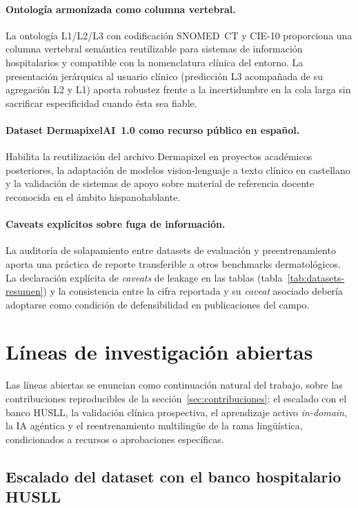 \paragraph{Ontología armonizada como columna vertebral.}
La ontología L1/L2/L3 con codificación SNOMED~CT y CIE-10
proporciona una columna vertebral semántica reutilizable para
sistemas de información hospitalarios y compatible con la
nomenclatura clínica del entorno. La presentación jerárquica al
usuario clínico (predicción L3 acompañada de su agregación L2 y
L1) aporta robustez frente a la incertidumbre en la cola larga sin
sacrificar especificidad cuando ésta sea fiable.

\paragraph{Dataset DermapixelAI~1.0 como recurso público en español.}
Habilita la reutilización del archivo Dermapixel en proyectos
académicos posteriores, la adaptación de modelos vision-lenguaje a
texto clínico en castellano y la validación de sistemas de apoyo
sobre material de referencia docente reconocida en el ámbito
hispanohablante.

\paragraph{Caveats explícitos sobre fuga de información.}
La auditoría de solapamiento entre datasets de evaluación y
preentrenamiento aporta una práctica de reporte transferible a
otros benchmarks dermatológicos. La declaración explícita de
\emph{caveats} de leakage en las tablas
(tabla~\ref{tab:datasets-resumen}) y la consistencia entre la cifra
reportada y su \emph{caveat} asociado debería adoptarse como
condición de defensibilidad en publicaciones del campo.

\section{Líneas de investigación abiertas}
\label{sec:lineas-abiertas}

Las líneas abiertas se enuncian como continuación natural del trabajo,
sobre las contribuciones reproducibles de la
sección~\ref{sec:contribuciones}: el escalado con el banco HUSLL, la
validación clínica prospectiva, el aprendizaje activo \emph{in-domain},
la IA agéntica y el reentrenamiento multilingüe de la rama lingüística,
condicionados a recursos o aprobaciones específicas.

\subsection{Escalado del dataset con el banco hospitalario HUSLL}
\label{sec:linea-husll}

